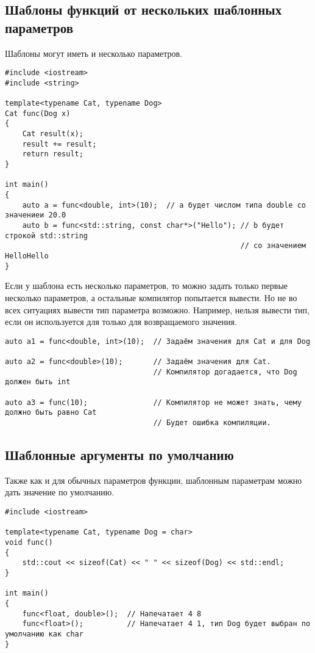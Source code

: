 \documentclass{article}
\begin{document}
\subsection*{Шаблоны функций от нескольких шаблонных параметров}
Шаблоны могут иметь и несколько параметров.
\begin{lstlisting}
#include <iostream>
#include <string>

template<typename Cat, typename Dog>
Cat func(Dog x)
{
	Cat result(x);
	result += result;
	return result;
}

int main()
{
	auto a = func<double, int>(10);  // a будет числом типа double со значениеи 20.0
	auto b = func<std::string, const char*>("Hello"); // b будет строкой std::string
													  // со значением HelloHello
}
\end{lstlisting}
Если у шаблона есть несколько параметров, то можно задать только первые несколько параметров, а остальные компилятор попытается вывести. Но не во всех ситуациях вывести тип параметра возможно. Например, нельзя вывести тип, если он используется для только для возвращаемого значения.
\begin{lstlisting}
auto a1 = func<double, int>(10);  // Задаём значения для Cat и для Dog

auto a2 = func<double>(10);       // Задаём значения для Cat. 
                                  // Компилятор догадается, что Dog должен быть int                  
                                  
auto a3 = func(10);               // Компилятор не может знать, чему должно быть равно Cat
                                  // Будет ошибка компиляции.
\end{lstlisting}

\subsection*{Шаблонные аргументы по умолчанию}
\noindent
Также как и для обычных параметров функции, шаблонным параметрам можно дать значение по умолчанию.
\begin{lstlisting}
#include <iostream>

template<typename Cat, typename Dog = char>
void func()
{
	std::cout << sizeof(Cat) << " " << sizeof(Dog) << std::endl;
}

int main()
{
	func<float, double>();  // Напечатает 4 8
	func<float>();          // Напечатает 4 1, тип Dog будет выбран по умолчанию как char
}
\end{lstlisting}
\end{document}
